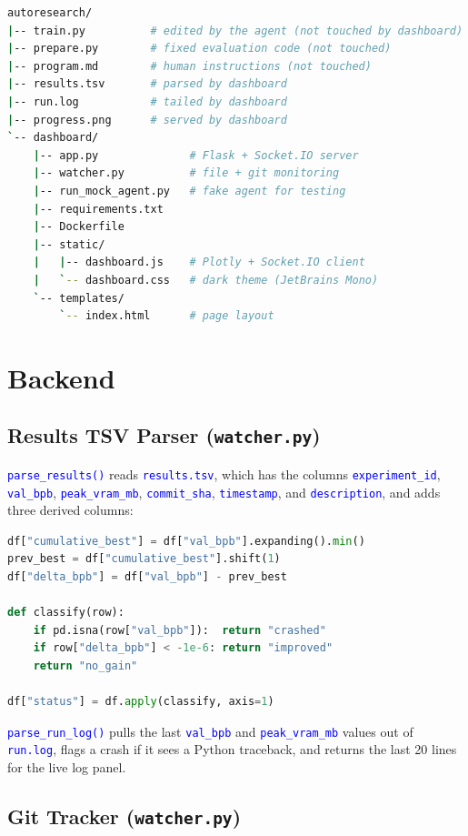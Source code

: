 \documentclass[11pt,a4paper]{article}
\newcommand{\code}[1]{\texttt{\textcolor{blue}{#1}}}
\begin{document}
\begin{lstlisting}[language=bash, caption={Dashboard file structure}]
autoresearch/
|-- train.py          # edited by the agent (not touched by dashboard)
|-- prepare.py        # fixed evaluation code (not touched)
|-- program.md        # human instructions (not touched)
|-- results.tsv       # parsed by dashboard
|-- run.log           # tailed by dashboard
|-- progress.png      # served by dashboard
`-- dashboard/
    |-- app.py              # Flask + Socket.IO server
    |-- watcher.py          # file + git monitoring
    |-- run_mock_agent.py   # fake agent for testing
    |-- requirements.txt
    |-- Dockerfile
    |-- static/
    |   |-- dashboard.js    # Plotly + Socket.IO client
    |   `-- dashboard.css   # dark theme (JetBrains Mono)
    `-- templates/
        `-- index.html      # page layout
\end{lstlisting}

\section{Backend}

\subsection{Results TSV Parser (\texttt{watcher.py})}

\code{parse\_results()} reads \code{results.tsv}, which has the columns
\code{experiment\_id}, \code{val\_bpb}, \code{peak\_vram\_mb}, \code{commit\_sha},
\code{timestamp}, and \code{description}, and adds three derived columns:

\begin{lstlisting}[language=Python, caption={Derived columns in parse\_results()}]
df["cumulative_best"] = df["val_bpb"].expanding().min()
prev_best = df["cumulative_best"].shift(1)
df["delta_bpb"] = df["val_bpb"] - prev_best

def classify(row):
    if pd.isna(row["val_bpb"]):  return "crashed"
    if row["delta_bpb"] < -1e-6: return "improved"
    return "no_gain"

df["status"] = df.apply(classify, axis=1)
\end{lstlisting}

\code{parse\_run\_log()} pulls the last \code{val\_bpb} and \code{peak\_vram\_mb} values out of
\code{run.log}, flags a crash if it sees a Python traceback, and returns the last 20 lines for the
live log panel.

\subsection{Git Tracker (\texttt{watcher.py})}
\end{document}
